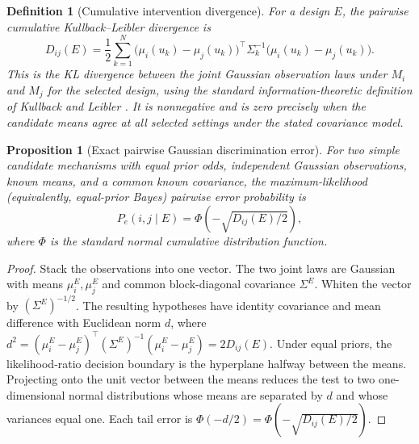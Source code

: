 \documentclass[11pt]{article}
\newtheorem{definition}{Definition}[section]
\newtheorem{proposition}{Proposition}[section]
\begin{document}
\begin{definition}[Cumulative intervention divergence]
For a design $E$, the pairwise cumulative Kullback--Leibler divergence is
\begin{equation}
D_{ij}(E)=\frac12\sum_{k=1}^{N}\big(\mu_i(u_k)-\mu_j(u_k)\big)^\top\Sigma_k^{-1}\big(\mu_i(u_k)-\mu_j(u_k)\big).
\end{equation}
This is the KL divergence between the joint Gaussian observation laws under $M_i$ and $M_j$ for the selected design, using the standard information-theoretic definition of Kullback and Leibler \citep{kullback1951}. It is nonnegative and is zero precisely when the candidate means agree at all selected settings under the stated covariance model.
\end{definition}

\begin{proposition}[Exact pairwise Gaussian discrimination error]
For two simple candidate mechanisms with equal prior odds, independent Gaussian observations, known means, and a common known covariance, the maximum-likelihood (equivalently, equal-prior Bayes) pairwise error probability is
\begin{equation}
P_e(i,j\mid E)=\Phi\!\left(-\sqrt{D_{ij}(E)/2}\right),
\end{equation}
where $\Phi$ is the standard normal cumulative distribution function.
\end{proposition}
\begin{proof}
Stack the observations into one vector. The two joint laws are Gaussian with means $\mu_i^E,\mu_j^E$ and common block-diagonal covariance $\Sigma^E$. Whiten the vector by $(\Sigma^E)^{-1/2}$. The resulting hypotheses have identity covariance and mean difference with Euclidean norm $d$, where $d^2=(\mu_i^E-\mu_j^E)^\top(\Sigma^E)^{-1}(\mu_i^E-\mu_j^E)=2D_{ij}(E)$. Under equal priors, the likelihood-ratio decision boundary is the hyperplane halfway between the means. Projecting onto the unit vector between the means reduces the test to two one-dimensional normal distributions whose means are separated by $d$ and whose variances equal one. Each tail error is $\Phi(-d/2)=\Phi(-\sqrt{D_{ij}(E)/2})$.
\end{proof}
\end{document}
